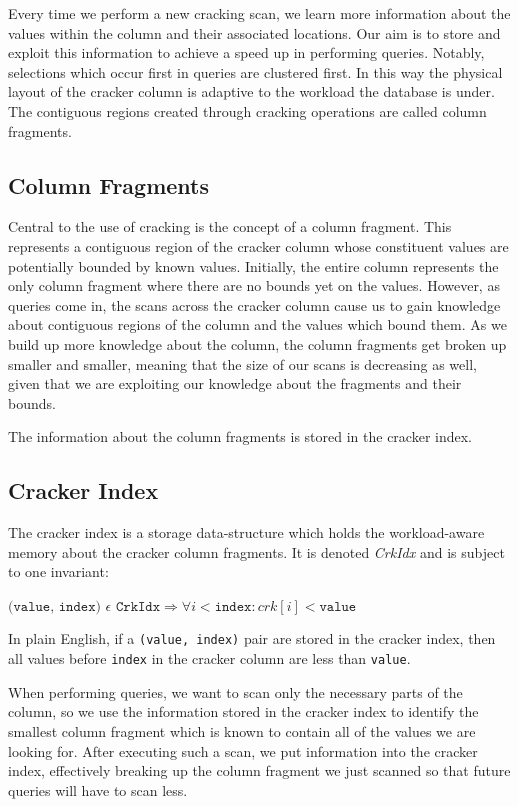 Every time we perform a new cracking scan, we learn more information about the values within the column and their associated locations. Our aim is to store and exploit this information to achieve a speed up in performing queries. Notably, selections which occur first in queries are clustered first. In this way the physical layout of the cracker column is adaptive to the workload the database is under. The contiguous regions created through cracking operations are called column fragments.

\subsection{Column Fragments}

Central to the use of cracking is the concept of a column fragment. This represents a contiguous region of the cracker column whose constituent values are potentially bounded by known values. Initially, the entire column represents the only column fragment where there are no bounds yet on the values. However, as queries come in, the scans across the cracker column cause us to gain knowledge about contiguous regions of the column and the values which bound them. As we build up more knowledge about the column, the column fragments get broken up smaller and smaller, meaning that the size of our scans is decreasing as well, given that we are exploiting our knowledge about the fragments and their bounds.

The information about the column fragments is stored in the cracker index.

\subsection{Cracker Index}

The cracker index is a storage data-structure which holds the workload-aware memory about the cracker column fragments. It is denoted \textit{CrkIdx} and is subject to one invariant:

\begin{tcolorbox}
$\texttt{(value, index)}$ $\epsilon$ $\texttt{CrkIdx} \Longrightarrow \forall i < \texttt{index}: crk[i] < \texttt{value}$
\end{tcolorbox}

In plain English, if a \texttt{(value, index)} pair are stored in the cracker index, then all values before \texttt{index} in the cracker column are less than \texttt{value}.

When performing queries, we want to scan only the necessary parts of the column, so we use the information stored in the cracker index to identify the smallest column fragment which is known to contain all of the values we are looking for. After executing such a scan, we put information into the cracker index, effectively breaking up the column fragment we just scanned so that future queries will have to scan less.

